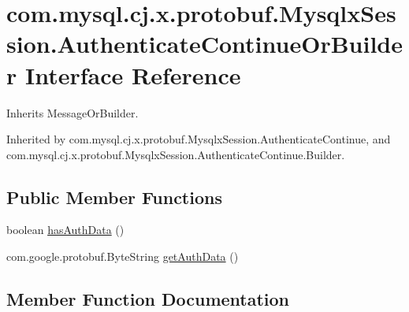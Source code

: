 \hypertarget{interfacecom_1_1mysql_1_1cj_1_1x_1_1protobuf_1_1_mysqlx_session_1_1_authenticate_continue_or_builder}{}\section{com.\+mysql.\+cj.\+x.\+protobuf.\+Mysqlx\+Session.\+Authenticate\+Continue\+Or\+Builder Interface Reference}
\label{interfacecom_1_1mysql_1_1cj_1_1x_1_1protobuf_1_1_mysqlx_session_1_1_authenticate_continue_or_builder}


Inherits Message\+Or\+Builder.



Inherited by com.\+mysql.\+cj.\+x.\+protobuf.\+Mysqlx\+Session.\+Authenticate\+Continue, and com.\+mysql.\+cj.\+x.\+protobuf.\+Mysqlx\+Session.\+Authenticate\+Continue.\+Builder.

\subsection*{Public Member Functions}
\begin{DoxyCompactItemize}
\item 
boolean \mbox{\hyperlink{interfacecom_1_1mysql_1_1cj_1_1x_1_1protobuf_1_1_mysqlx_session_1_1_authenticate_continue_or_builder_a971d3adc955797742de2724eb0391d18}{has\+Auth\+Data}} ()
\item 
com.\+google.\+protobuf.\+Byte\+String \mbox{\hyperlink{interfacecom_1_1mysql_1_1cj_1_1x_1_1protobuf_1_1_mysqlx_session_1_1_authenticate_continue_or_builder_ac6e3347d2e15d26a441187a73c5763c1}{get\+Auth\+Data}} ()
\end{DoxyCompactItemize}


\subsection{Member Function Documentation}
\mbox{\label{interfacecom_1_1mysql_1_1cj_1_1x_1_1protobuf_1_1_mysqlx_session_1_1_authenticate_continue_or_builder_ac6e3347d2e15d26a441187a73c5763c1}} 
